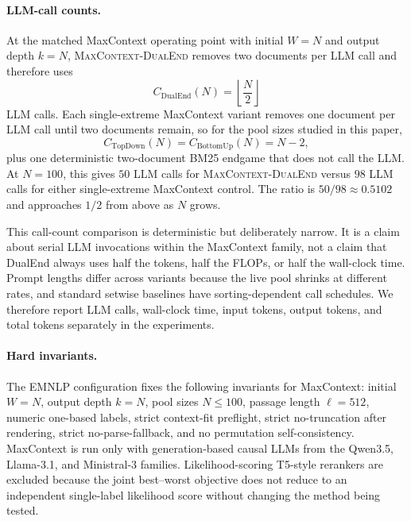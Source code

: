 \paragraph{LLM-call counts.}
At the matched MaxContext operating point with initial $W=N$ and output
depth $k=N$, \textsc{MaxContext-DualEnd} removes two documents per LLM
call and therefore uses
\[
C_{\mathrm{DualEnd}}(N)=\left\lfloor \frac{N}{2} \right\rfloor
\]
LLM calls. Each single-extreme MaxContext variant removes one document
per LLM call until two documents remain, so for the pool sizes studied in
this paper,
\[
C_{\mathrm{TopDown}}(N)=C_{\mathrm{BottomUp}}(N)=N-2,
\]
plus one deterministic two-document BM25 endgame that does not call the
LLM. At $N=100$, this gives $50$ LLM calls for
\textsc{MaxContext-DualEnd} versus $98$ LLM calls for either
single-extreme MaxContext control. The ratio is $50/98 \approx 0.5102$
and approaches $1/2$ from above as $N$ grows.

This call-count comparison is deterministic but deliberately narrow. It
is a claim about serial LLM invocations within the MaxContext family, not
a claim that DualEnd always uses half the tokens, half the FLOPs, or half
the wall-clock time. Prompt lengths differ across variants because the
live pool shrinks at different rates, and standard setwise baselines have
sorting-dependent call schedules. We therefore report LLM calls,
wall-clock time, input tokens, output tokens, and total tokens separately
in the experiments.

\paragraph{Hard invariants.}
The EMNLP configuration fixes the following invariants for MaxContext:
initial $W=N$, output depth $k=N$, pool sizes $N \le 100$, passage length
$\ell=512$, numeric one-based labels, strict context-fit preflight,
strict no-truncation after rendering, strict no-parse-fallback, and no
permutation self-consistency. MaxContext is run only with generation-based
causal LLMs from the Qwen3.5, Llama-3.1, and Ministral-3 families.
Likelihood-scoring T5-style rerankers are excluded because the
joint best--worst objective does not reduce to an independent
single-label likelihood score without changing the method being tested.